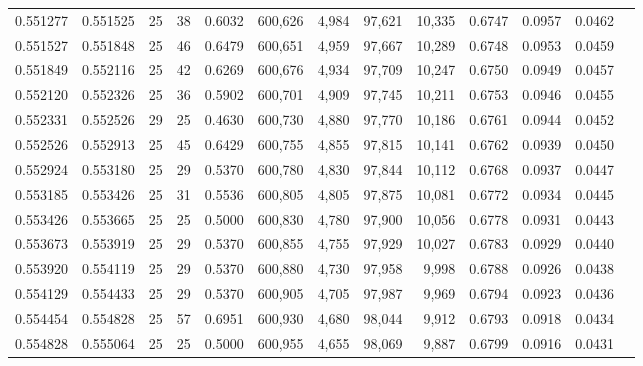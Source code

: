 \begin{tabular}{rrrrrrrrrrrrr}
0.551277 & 0.551525 &    25 &  38 &                                     0.6032 & 600,626 &   4,984 &  97,621 &  10,335 & 0.6747 & 0.0957 & 0.0462 \\
0.551527 & 0.551848 &    25 &  46 &                                     0.6479 & 600,651 &   4,959 &  97,667 &  10,289 & 0.6748 & 0.0953 & 0.0459 \\
0.551849 & 0.552116 &    25 &  42 &                                     0.6269 & 600,676 &   4,934 &  97,709 &  10,247 & 0.6750 & 0.0949 & 0.0457 \\
0.552120 & 0.552326 &    25 &  36 &                                     0.5902 & 600,701 &   4,909 &  97,745 &  10,211 & 0.6753 & 0.0946 & 0.0455 \\
0.552331 & 0.552526 &    29 &  25 &                                     0.4630 & 600,730 &   4,880 &  97,770 &  10,186 & 0.6761 & 0.0944 & 0.0452 \\
0.552526 & 0.552913 &    25 &  45 &                                     0.6429 & 600,755 &   4,855 &  97,815 &  10,141 & 0.6762 & 0.0939 & 0.0450 \\
0.552924 & 0.553180 &    25 &  29 &                                     0.5370 & 600,780 &   4,830 &  97,844 &  10,112 & 0.6768 & 0.0937 & 0.0447 \\
0.553185 & 0.553426 &    25 &  31 &                                     0.5536 & 600,805 &   4,805 &  97,875 &  10,081 & 0.6772 & 0.0934 & 0.0445 \\
0.553426 & 0.553665 &    25 &  25 &                                     0.5000 & 600,830 &   4,780 &  97,900 &  10,056 & 0.6778 & 0.0931 & 0.0443 \\
0.553673 & 0.553919 &    25 &  29 &                                     0.5370 & 600,855 &   4,755 &  97,929 &  10,027 & 0.6783 & 0.0929 & 0.0440 \\
0.553920 & 0.554119 &    25 &  29 &                                     0.5370 & 600,880 &   4,730 &  97,958 &   9,998 & 0.6788 & 0.0926 & 0.0438 \\
0.554129 & 0.554433 &    25 &  29 &                                     0.5370 & 600,905 &   4,705 &  97,987 &   9,969 & 0.6794 & 0.0923 & 0.0436 \\
0.554454 & 0.554828 &    25 &  57 &                                     0.6951 & 600,930 &   4,680 &  98,044 &   9,912 & 0.6793 & 0.0918 & 0.0434 \\
0.554828 & 0.555064 &    25 &  25 &                                     0.5000 & 600,955 &   4,655 &  98,069 &   9,887 & 0.6799 & 0.0916 & 0.0431 \\

\end{tabular}
